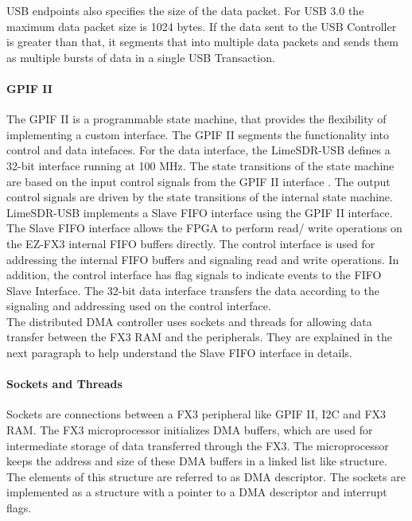 USB endpoints also specifies the size of the data packet.
For USB 3.0 the maximum data packet size is 1024 bytes.
If the data sent to the USB Controller is greater than that, it segments that into multiple data packets and sends them as multiple bursts of data in a single USB Transaction. 
 
\paragraph{GPIF II}
The \ac{GPIF} II is a programmable state machine, that provides the flexibility of implementing a custom interface.
The GPIF II segments the functionality into control and data intefaces.
For the data interface, the LimeSDR-USB defines a 32-bit interface running at 100 MHz.
The state transitions of the state machine are based on the input control signals from the GPIF II interface .
The output control signals are driven by the state transitions of the internal state machine.\\

LimeSDR-USB implements a Slave FIFO interface using the \ac{GPIF} II interface.
The Slave FIFO interface allows the \ac{FPGA} to perform read/ write operations on the EZ-FX3 internal FIFO buffers directly.
The control interface is used for addressing the internal FIFO buffers and signaling read and write operations.
In addition, the control interface has flag signals to indicate events to the FIFO Slave Interface.
The 32-bit data interface transfers the data according to the signaling and addressing used on the control interface.\\

The distributed \ac{DMA} controller uses sockets and threads for allowing data transfer between the FX3 RAM and the peripherals.
They are explained in the next paragraph to help understand the Slave FIFO interface in details.

\paragraph{Sockets and Threads}
Sockets are connections between a FX3 peripheral like GPIF II, I2C and FX3 RAM. 
The FX3 microprocessor initializes \ac{DMA} buffers, which are used for intermediate storage of data transferred through the FX3.
The microprocessor keeps the address and size of these \ac{DMA} buffers in a linked list like structure.
The elements of this structure are referred to as \ac{DMA} descriptor.
The sockets are implemented as a structure with a pointer to a \ac{DMA} descriptor and interrupt flags.\\ 

